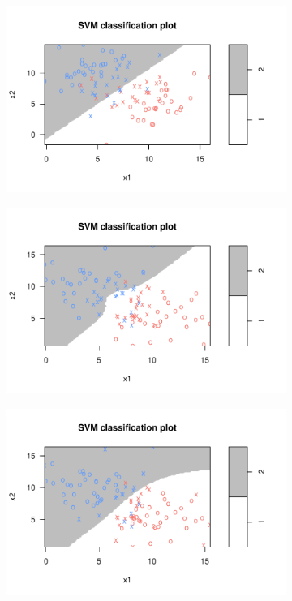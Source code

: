 \documentclass[aspectratio=169,10pt]{beamer}
\begin{document}
\begin{frame}{\secname}{\subsecname}
  \begin{figure}
    \begin{subfigure}[t]{.45\textwidth}
      \centering
      \includegraphics[width=.65\textwidth]{scripts/output/support-vector-classifier.pdf}
    \end{subfigure}\hfill
    \begin{subfigure}[t]{.45\textwidth}
      \centering
      \includegraphics[width=.65\textwidth]{scripts/output/polynomial_kernel.pdf}
    \end{subfigure}\hfill
    \begin{subfigure}[t]{.45\textwidth}
      \centering
      \includegraphics[width=.65\textwidth]{scripts/output/radial_kernel.pdf}
    \end{subfigure}\hfill
    \begin{subfigure}[t]{.45\textwidth}

\end{subfigure}
\end{figure}
\end{frame}
\end{document}

